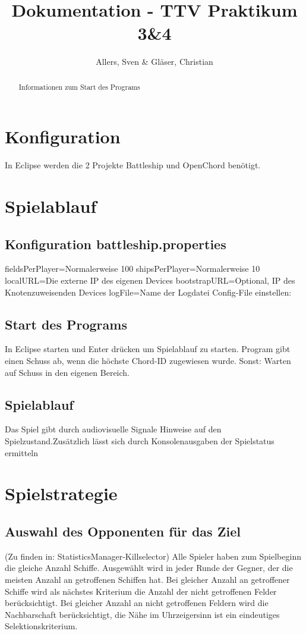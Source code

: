 \documentclass[a4paper]{article}
\title{Dokumentation - TTV Praktikum 3\&4}
\author{Allers, Sven \& Gläser, Christian}
\begin{document}
\maketitle

\begin{abstract}
Informationen zum Start des Programs
\end{abstract}
\section{Konfiguration}
In Eclipse werden die 2 Projekte Battleship und OpenChord benötigt.
\section{Spielablauf}
\subsection{Konfiguration battleship.properties}
fieldsPerPlayer=Normalerweise 100\newline
shipsPerPlayer=Normalerweise 10\newline
localURL=Die externe IP des eigenen Devices\newline
bootstrapURL=Optional, IP des Knotenzuweisenden Devices\newline
logFile=Name der Logdatei
Config-File einstellen:\newline
\subsection{Start des Programs}
In Eclipse starten und Enter drücken um Spielablauf zu starten. Program gibt einen Schuss ab, wenn die höchste Chord-ID zugewiesen wurde.\newline
Sonst: Warten auf Schuss in den eigenen Bereich.
\subsection{Spielablauf}
Das Spiel gibt durch audiovisuelle Signale Hinweise auf den Spielzustand.\newline Zusätzlich lässt sich durch Konsolenausgaben der Spielstatus ermitteln
\section{Spielstrategie}
\subsection{Auswahl des Opponenten für das Ziel}
(Zu finden in: StatisticsManager-Killselector)\newline
Alle Spieler haben zum Spielbeginn die gleiche Anzahl Schiffe. \newline
Ausgewählt wird in jeder Runde der Gegner, der die meisten Anzahl an getroffenen Schiffen hat.\newline
Bei gleicher Anzahl an getroffener Schiffe wird als nächstes Kriterium die Anzahl der nicht getroffenen Felder berücksichtigt.\newline
Bei gleicher Anzahl an nicht getroffenen Feldern wird die Nachbarschaft berücksichtigt, die Nähe im Uhrzeigersinn ist ein eindeutiges Selektionskriterium.
\end{document}
